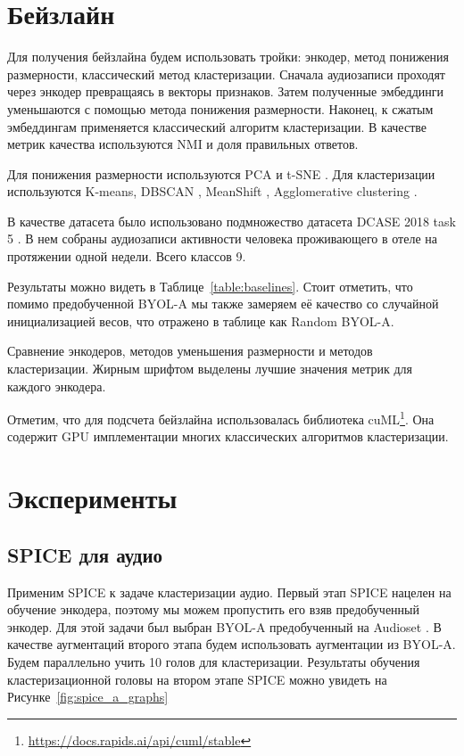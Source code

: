 \documentclass[a4paper,12pt]{extarticle}
\begin{document}
\section{Бейзлайн}

Для получения бейзлайна будем использовать тройки: 
энкодер, метод понижения размерности, классический 
метод кластеризации. Сначала аудиозаписи проходят 
через энкодер превращаясь в векторы признаков. 
Затем полученные эмбеддинги уменьшаются с помощью метода
понижения размерности. Наконец, к сжатым эмбеддингам 
применяется классический алгоритм кластеризации. 
В качестве метрик качества используются NMI и доля 
правильных ответов.

Для понижения размерности используются PCA \cite{PCA_overview} и 
t-SNE \cite{JMLR:v9:vandermaaten08a}. Для кластеризации 
используются K-means, DBSCAN \cite{ester1996density}, 
MeanShift \cite{fukunaga1975estimation}, Agglomerative 
clustering \cite{agglomerative}.

В качестве датасета было использовано подмножество 
датасета DCASE 2018 task 5 \cite{dcase2018_task5}.
В нем собраны аудиозаписи активности человека проживающего в 
отеле на протяжении одной недели. Всего классов 9. 

Результаты можно видеть в Таблице~\ref{table:baselines}. 
Стоит отметить, что помимо предобученной BYOL-A мы 
также замеряем её качество со случайной инициализацией 
весов, что отражено в таблице как Random BYOL-A.
\begin{table}[]
    \footnotesize
	\centering

	\caption{Сравнение энкодеров, методов уменьшения размерности и методов кластеризации.
	Жирным шрифтом выделены лучшие значения метрик для каждого энкодера.}
	\label{table:baselines}
\end{table}

Отметим, что для подсчета бейзлайна использовалась библиотека 
cuML\footnote{\url{https://docs.rapids.ai/api/cuml/stable}}.
Она содержит GPU имплементации многих классических алгоритмов 
кластеризации. 

\section{Эксперименты}

\subsection{SPICE для аудио}

    Применим SPICE к задаче кластеризации аудио. 
    Первый этап SPICE нацелен на обучение энкодера, поэтому 
    мы можем пропустить его взяв предобученный энкодер. Для 
    этой задачи был выбран BYOL-A предобученный на Audioset \cite{audioset}. 
    В качестве аугментаций второго этапа будем использовать аугментации из 
    BYOL-A. Будем параллельно учить 10 голов для кластеризации. 
    Результаты обучения кластеризационной головы на втором этапе 
    SPICE можно увидеть на Рисунке~\ref{fig:spice_a_graphs}
\end{document}
